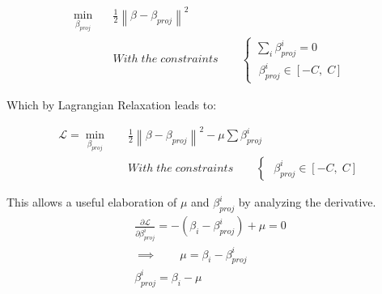 \documentclass[12pt]{article}
\newcommand{\norm}[1]{\left\lVert#1\right\rVert}
\newcommand{\Lagr}{\mathcal{L}}
\begin{document}
    \begin{equation}\label{eq:11}
	    \begin{aligned}
	    \min_{\beta_{proj}} \quad &\frac{1}{2}\norm{\beta - \beta_{proj}}^2\\ 
		&With\;the\;constraints\qquad
        \begin{cases}
            \sum_i \beta_{proj}^i = 0 \\
            \;\beta_{proj}^i\in[-C,\;C] 
        \end{cases}
        \end{aligned}
	\end{equation}
    
    Which by Lagrangian Relaxation leads to:
    
    \begin{equation}\label{eq:12}
	    \begin{aligned}
	    \Lagr = \min_{\beta_{proj}} \quad &\frac{1}{2}\norm{\beta - \beta_{proj}}^2 - \mu\sum\beta_{proj}^i\\ 
		&With\;the\;constraints\qquad
        \begin{cases}
            \;\beta_{proj}^i\in[-C,\;C] 
        \end{cases}
        \end{aligned}
	\end{equation}
	
	This allows a useful elaboration of $\mu$ and $\beta_{proj}^i$ by analyzing the derivative.
    \begin{equation}\label{eq:13}
        \begin{aligned}
            \frac{\partial{\Lagr}}{\partial{\beta_{proj}^i}} = -(\beta_i - \beta_{proj}^i) + \mu = 0 \\
    	    \implies \qquad \mu = \beta_i - \beta_{proj}^i\\
    	    \beta_{proj}^i = \beta_i - \mu\\
        \end{aligned}
	\end{equation}
	
\end{document}
